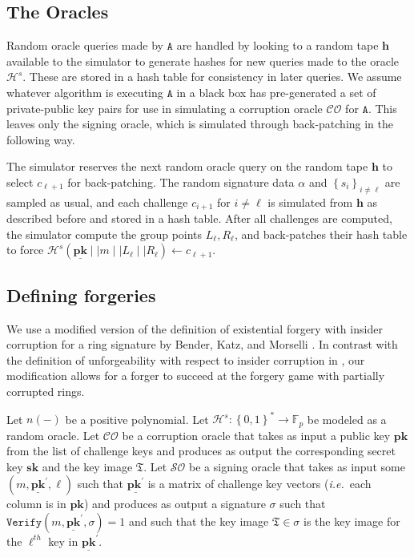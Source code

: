 \documentclass{mrl}
\theoremstyle{plain}
\theoremstyle{definition}
\begin{document}
\subsection{The Oracles}\label{app:oracles}
Random oracle queries made by $\texttt{A}$ are handled by looking to a random tape $\textbf{h}$ available to the simulator to generate hashes for new queries made to the oracle $\mathcal{H}^s$. These are stored in a hash table for consistency in later queries.  We assume whatever algorithm is executing $\texttt{A}$ in a black box has pre-generated a set of private-public key pairs for use in simulating a corruption oracle $\mathcal{CO}$ for $\texttt{A}$. This leaves only the signing oracle, which is simulated through back-patching in the following way.

The simulator reserves the next random oracle query on the random tape $\textbf{h}$ to select $c_{\ell+1}$ for back-patching. The random signature data $\alpha$ and $\left\{s_i\right\}_{i \neq \ell}$ are sampled as usual, and each challenge $c_{i+1}$ for $i \neq \ell$ is simulated from $\textbf{h}$ as described before and stored in a hash table. After all challenges are computed, the simulator compute the group points $L_\ell, R_\ell$, and back-patches their hash table to force $\mathcal{H}^s(\underline{\textbf{pk}} \mid \mid m \mid \mid L_\ell \mid \mid R_\ell) \leftarrow c_{\ell+1}$.


\subsection{Defining forgeries}
We use a modified version of the definition of existential forgery with insider corruption for a ring signature by Bender, Katz, and Morselli \cite{bender}. In contrast with the definition of unforgeability with respect to insider corruption in \cite{bender}, our modification allows for a forger to succeed at the forgery game with partially corrupted rings.  

Let $n(-)$ be a positive polynomial. Let $\mathcal{H}^s:\left\{0,1\right\}^* \to \mathbb{F}_p$ be modeled as a random oracle. Let $\mathcal{CO}$ be a corruption oracle that takes as input a public key $\textbf{pk}$ from the list of challenge keys and produces as output the corresponding secret key $\textbf{sk}$ and the key image $\mathfrak{T}$. Let $\mathcal{SO}$ be a signing oracle that takes as input some $(m, \underline{\textbf{pk}}^\prime, \ell)$ such that $\underline{\textbf{pk}^\prime}$ is a matrix of challenge key vectors (\textit{i.e.}\ each column is in $\textbf{pk}$) and produces as output a signature $\sigma$ such that $\texttt{Verify}(m, \underline{\textbf{pk}}^\prime, \sigma) = 1$ and such that the key image $\mathfrak{T} \in \sigma$ is the key image for the $\ell^{th}$ key in $\underline{\textbf{pk}}^\prime$.
\end{document}
